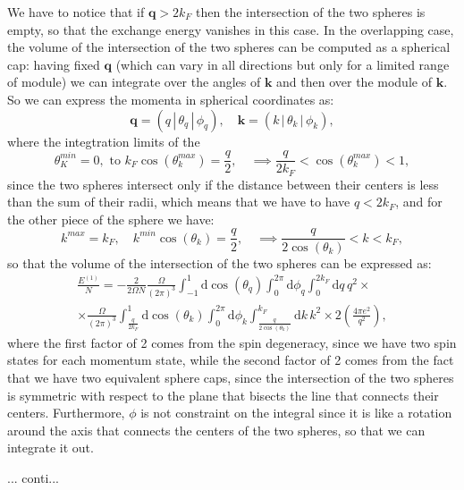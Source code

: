 We have to notice that if \(\mathbf{q} > 2 k_F\) then the intersection of the two spheres is empty, so that the exchange energy vanishes in this case. In the overlapping case, the volume of the intersection of the two spheres can be computed as a spherical cap: having fixed \(\mathbf{q}\) (which can vary in all directions but only for a limited range of module) we can integrate over the angles of \(\mathbf{k}\) and then over the module of \(\mathbf{k}\). So we can express the momenta in spherical coordinates as:
\[
    \mathbf{q} = (q \,|\, \theta_q \,|\, \phi_q), \quad \mathbf{k} = (k \,|\, \theta_k \,|\, \phi_k),
\]
where the integtration limits of the
\[
    \theta_K^{min} = 0, \text{ to } k_F \cos(\theta_k^{max}) = \frac{q}{2}, \quad \implies \frac{q}{2k_F} < \cos(\theta_k^{max}) < 1,
\]
since the two spheres intersect only if the distance between their centers is less than the sum of their radii, which means that we have to have \(q < 2 k_F\), and for the other piece of the sphere we have:
\[
    k^{max} = k_F, \quad k^{min}\cos(\theta_k) = \frac{q}{2}, \quad \implies \frac{q}{2 \cos(\theta_k)} < k < k_F,
\]
so that the volume of the intersection of the two spheres can be expressed as:
\[
    \begin{aligned}
        \frac{E^{(1)}}{N} = - \frac{2}{2 \Omega N} \frac{\Omega}{(2\pi)^3} \int_{-1}^{1} \mathrm{d} \cos(\theta_q) \int_0^{2\pi} \mathrm{d}\phi_q \int_{0}^{2k_F} \mathrm{d} q \, q^2 \times \\
        \times \frac{\Omega}{(2\pi)^3} \int_{\tfrac{q}{2 k_F}}^{1} \mathrm{d} \cos(\theta_k) \int_0^{2\pi} \mathrm{d}\phi_k \int_{\frac{q}{2 \cos(\theta_k)}}^{k_F} \mathrm{d} k \, k^2 \times 2 \left( \frac{4 \pi e^2}{q^2} \right),
    \end{aligned}
\]
where the first factor of 2 comes from the spin degeneracy, since we have two spin states for each momentum state, while the second factor of 2 comes from the fact that we have two equivalent sphere caps, since the intersection of the two spheres is symmetric with respect to the plane that bisects the line that connects their centers. Furthermore, \(\phi\) is not constraint on the integral since it is like a rotation around the axis that connects the centers of the two spheres, so that we can integrate it out.


... conti...

